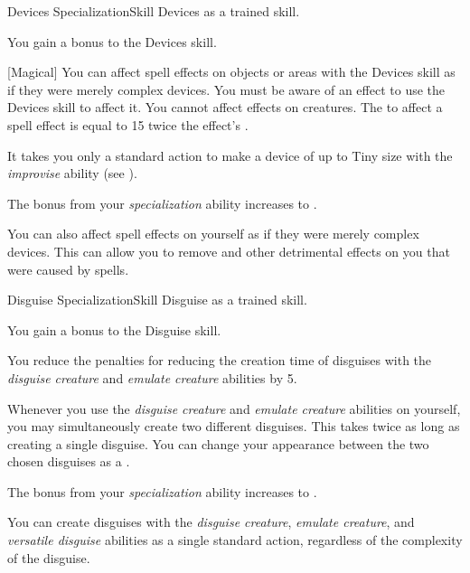     \begin{feat}{Devices Specialization}{Skill}
        \featpre Devices as a trained skill.

         You gain a  bonus to the Devices skill.

        [Magical] You can affect spell effects on objects or areas with the Devices skill as if they were merely complex devices.
        You must be aware of an effect to use the Devices skill to affect it.
        You cannot affect effects on creatures.
        The  to affect a spell effect is equal to 15 \add twice the effect's .

         It takes you only a standard action to make a device of up to Tiny size with the \textit{improvise} ability (see ).

         The bonus from your \textit{specialization} ability increases to .

         You can also affect spell effects on yourself as if they were merely complex devices.
        This can allow you to remove  and other detrimental effects on you that were caused by spells.
    \end{feat}

    \begin{feat}{Disguise Specialization}{Skill}
        \featpre Disguise as a trained skill.

         You gain a  bonus to the Disguise skill.

         You reduce the penalties for reducing the creation time of disguises with the \textit{disguise creature} and \textit{emulate creature} abilities by 5.

         Whenever you use the \textit{disguise creature} and \textit{emulate creature} abilities on yourself, you may simultaneously create two different disguises.
        This takes twice as long as creating a single disguise.
        You can change your appearance between the two chosen disguises as a .

         The bonus from your \textit{specialization} ability increases to .

         You can create disguises with the \textit{disguise creature}, \textit{emulate creature}, and \textit{versatile disguise} abilities as a single standard action, regardless of the complexity of the disguise.
    \end{feat}

